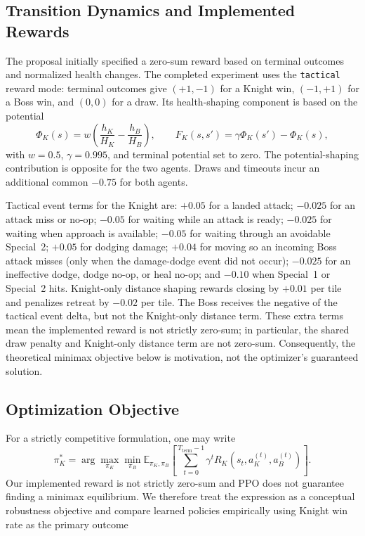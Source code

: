 \documentclass{article}
\begin{document}
\subsection{Transition Dynamics and Implemented Rewards}
The proposal initially specified a zero-sum reward based on terminal outcomes and normalized health changes. The completed experiment uses the \texttt{tactical} reward mode: terminal outcomes give $(+1,-1)$ for a Knight win, $(-1,+1)$ for a Boss win, and $(0,0)$ for a draw. Its health-shaping component is based on the potential
\begin{equation}
\Phi_K(s)=w\left(\frac{h_K}{H_K}-\frac{h_B}{H_B}\right),
\qquad
F_K(s,s')=\gamma\Phi_K(s')-\Phi_K(s),
\end{equation}
with $w=0.5$, $\gamma=0.995$, and terminal potential set to zero. The potential-shaping contribution is opposite for the two agents. Draws and timeouts incur an additional common $-0.75$ for both agents.

Tactical event terms for the Knight are: $+0.05$ for a landed attack; $-0.025$ for an attack miss or no-op; $-0.05$ for waiting while an attack is ready; $-0.025$ for waiting when approach is available; $-0.05$ for waiting through an avoidable Special~2; $+0.05$ for dodging damage; $+0.04$ for moving so an incoming Boss attack misses (only when the damage-dodge event did not occur); $-0.025$ for an ineffective dodge, dodge no-op, or heal no-op; and $-0.10$ when Special~1 or Special~2 hits. Knight-only distance shaping rewards closing by $+0.01$ per tile and penalizes retreat by $-0.02$ per tile. The Boss receives the negative of the tactical event delta, but not the Knight-only distance term. These extra terms mean the implemented reward is not strictly zero-sum; in particular, the shared draw penalty and Knight-only distance term are not zero-sum. Consequently, the theoretical minimax objective below is motivation, not the optimizer's guaranteed solution.

\subsection{Optimization Objective}
For a strictly competitive formulation, one may write
\begin{equation}
\pi_K^*=\arg\max_{\pi_K}\min_{\pi_B}
\mathbb{E}_{\pi_K,\pi_B}\left[
\sum_{t=0}^{T_{\mathrm{term}}-1}\gamma^t R_K(s_t,a_K^{(t)},a_B^{(t)})
\right].
\end{equation}
Our implemented reward is not strictly zero-sum and PPO does not guarantee finding a minimax equilibrium. We therefore treat the expression as a conceptual robustness objective and compare learned policies empirically using Knight win rate as the primary outcome
\end{document}
